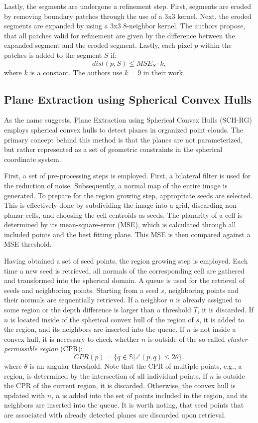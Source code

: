 \documentclass[main.tex]{subfiles}
\begin{document}
Lastly, the segments are undergone a refinement step.
First, segments are eroded by removing boundary patches through the use of a 3x3 kernel. Next, the eroded segments are expanded by using
a 3x3 8-neighbor kernel. The authors propose, that all patches valid for refinement are given by the difference between
the expanded segment and the eroded segment. Lastly, each pixel $p$ within the patches is added to
the segment $S$ if:
\begin{equation}
    dist(p,S) \leq MSE_S \cdot k,
\end{equation}
where $k$ is a constant. The authors use $k=9$ in their work.

\subsection{Plane Extraction using Spherical Convex Hulls}
\label{subsec:bg-schrg}
As the name suggests, Plane Extraction using Spherical Convex Hulls (SCH-RG) employs spherical convex hulls to
detect planes in organized point clouds.
The primary concept behind this method is that the planes are not parameterized, but rather represented as
a set of geometric constraints in the spherical coordinate system.

First, a set of pre-processing steps is employed.
First, a bilateral filter is used for the reduction of noise. Subsequently, a normal map of the entire image
is generated.
To prepare for the region growing step, appropriate seeds are selected. This is effectively done by subdividing the
image into a grid, discarding non-planar cells, and choosing the cell centroids as seeds.
The planarity of a cell is determined by its mean-square-error (MSE), which is calculated through all included
points and the best fitting plane. This MSE is then compared against a MSE threshold.

Having obtained a set of seed points, the region growing step is employed.
Each time a new seed is retrieved, all normals of the corresponding cell are gathered and transformed
into the spherical domain. A queue is used for the retrieval of seeds and neighboring points.
Starting from a seed $s$, neighboring points and their normals are sequentially retrieved.
If a neighbor $n$ is already assigned to some region or the depth difference is larger than a threshold $T$, it is
discarded. If $n$ is located inside of the spherical convex hull of the region of $s$,
it is added to the region, and its neighbors are inserted into the queue. If $n$ is not inside a
convex hull, it is necessary to check whether $n$ is outside of the so-called \textit{cluster-permissible region} (CPR):
\begin{equation}
    CPR(p) = \{q \in \mathbb{S} | \angle(p,q)\leq 2\theta\},
\end{equation}
where $\theta$ is an angular threshold. Note that the CPR of multiple points, e.g., a region, is determined by
the intersection of all individual points.
If $n$ is outside the CPR of the current region, it is discarded. Otherwise, the convex hull is updated with $n$,
$n$ is added into the set of points included in the region, and its neighbors are inserted into the queue.
It is worth noting, that seed points that are associated with already detected planes are discarded upon retrieval.
\end{document}
